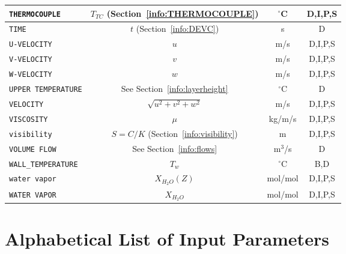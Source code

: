 \documentclass[11pt]{book}
\newcommand{\ct}{\tt\small}
\begin{document}
\begin{table}[h!]
\begin{center}
\begin{tabular}{|l|c|c|c|}
{\ct THERMOCOUPLE}                              & $T_{TC}$ (Section~\ref{info:THERMOCOUPLE})    & $^\circ$C      & D,I,P,S      \\ \hline
{\ct TIME}                                      & $t$ (Section~\ref{info:DEVC})                 & s              & D            \\ \hline
{\ct U-VELOCITY}                                & $u$                                           & m/s            & D,I,P,S      \\ \hline
{\ct V-VELOCITY}                                & $v$                                           & m/s            & D,I,P,S      \\ \hline
{\ct W-VELOCITY}                                & $w$                                           & m/s            & D,I,P,S      \\ \hline
{\ct UPPER TEMPERATURE}                         & See Section~\ref{info:layerheight}            & $^\circ$C      & D            \\ \hline
{\ct VELOCITY}                                  & $\sqrt{u^2+v^2+w^2}$                          & m/s            & D,I,P,S      \\ \hline
{\ct VISCOSITY}                                 & $\mu$                                         & kg/m/s         & D,I,P,S      \\ \hline
{\ct visibility}                                & $S=C/K$ (Section~\ref{info:visibility})       & m              & D,I,P,S      \\ \hline
{\ct VOLUME FLOW}                               & See Section~\ref{info:flows}                  & m$^3$/s        & D            \\ \hline
{\ct WALL\_TEMPERATURE}                         & $T_w$                                         & $^\circ$C      & B,D          \\ \hline
{\ct water vapor}                               & $X_{H_2O}(Z)$                                 & mol/mol        & D,I,P,S      \\ \hline
{\ct WATER VAPOR}                               & $X_{H_2O}$                                    & mol/mol        & D,I,P,S      \\ \hline
\end{tabular}
\end{center}
\end{table}




\chapter{Alphabetical List of Input Parameters}
\end{document}
